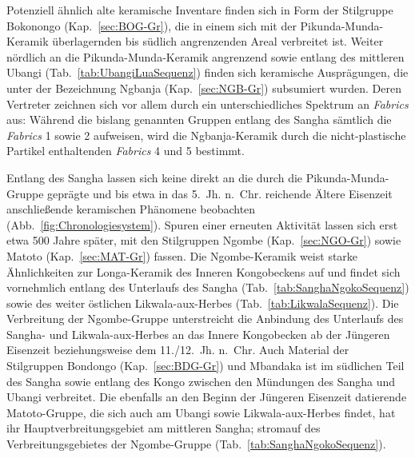 Potenziell ähnlich alte keramische Inventare finden sich in Form der Stilgruppe Bokonongo (Kap.~\ref{sec:BOG-Gr}), die in einem sich mit der Pikunda-Munda-Keramik überlagernden bis südlich angrenzenden Areal verbreitet ist. Weiter nördlich an die Pikunda-Munda-Keramik angrenzend sowie entlang des mittleren \mbox{Ubangi} (Tab.~\ref{tab:UbangiLuaSequenz}) finden sich keramische Ausprägungen, die unter der Bezeichnung \mbox{Ngbanja} (Kap.~\ref{sec:NGB-Gr}) subsumiert wurden. Deren Vertreter zeichnen sich vor allem durch ein unterschiedliches Spektrum an \textit{Fabrics} aus: Während die bislang genannten Gruppen entlang des \mbox{Sangha} sämtlich die \textit{Fabrics} 1 sowie 2 aufweisen, wird die \mbox{Ngbanja}-Keramik durch die nicht-plastische Partikel enthaltenden \textit{Fabrics} 4 und 5 bestimmt.

Entlang des \mbox{Sangha} lassen sich keine direkt an die durch die Pikunda-Munda-Gruppe geprägte und bis etwa in das 5.~Jh. n.~Chr. reichende Ältere Eisenzeit anschließende keramischen Phänomene beobachten (Abb.~\ref{fig:Chronologiesystem}). Spuren einer erneuten Aktivität lassen sich erst etwa 500 Jahre später, mit den Stilgruppen Ngombe (Kap.~\ref{sec:NGO-Gr}) sowie Matoto (Kap.~\ref{sec:MAT-Gr}) fassen. Die Ngombe-Keramik weist starke Ähnlichkeiten zur Longa-Keramik des Inneren Kongobeckens auf und findet sich vornehmlich entlang des Unterlaufs des \mbox{Sangha} (Tab.~\ref{tab:SanghaNgokoSequenz}) sowie des weiter östlichen \mbox{Likwala}-\mbox{aux}-\mbox{Herbes} (Tab.~\ref{tab:LikwalaSequenz}). Die Verbreitung der Ngombe-Gruppe unterstreicht die Anbindung des Unterlaufs des \mbox{Sangha}- und \mbox{Likwala}-\mbox{aux}-\mbox{Herbes} an das Innere Kongobecken ab der Jüngeren Eisenzeit beziehungsweise dem 11./12.~Jh. n.~Chr. Auch Material der Stilgruppen Bondongo (Kap.~\ref{sec:BDG-Gr}) und Mbandaka \parencite[Kap.~\ref{sec:MBA-Gr}; ][139--143]{Wotzka.1995} ist im südlichen Teil des \mbox{Sangha} sowie entlang des Kongo zwischen den Mündungen des \mbox{Sangha} und \mbox{Ubangi} verbreitet. Die ebenfalls an den Beginn der Jüngeren Eisenzeit datierende Matoto-Gruppe, die sich auch am \mbox{Ubangi} sowie \mbox{Likwala}-\mbox{aux}-\mbox{Herbes} findet, hat ihr Hauptverbreitungsgebiet am mittleren \mbox{Sangha}; stromauf des Verbreitungsgebietes der Ngombe-Gruppe (Tab.~\ref{tab:SanghaNgokoSequenz}).

